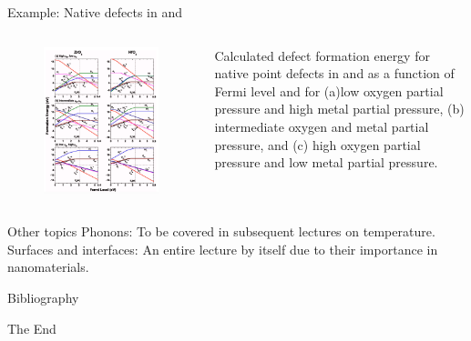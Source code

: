 \documentclass[aspectratio=169]{beamer}
\begin{document}
    \begin{frame}{Example: Native defects in  and }

        \begin{columns}
            \begin{figure}
                \centering
                \includegraphics[width=0.7\linewidth]{lectures/figures/8_Defect_Diagram_ZrO2_HfO2.png}
            \end{figure}
            Calculated defect formation energy for native point defects in  and  as a function of Fermi level and for (a)low oxygen partial pressure and high metal partial pressure, (b) intermediate oxygen and metal partial pressure, and (c) high oxygen partial pressure and low metal partial pressure.\cite{zhengFirstprinciplesStudyNative2007}
        \end{columns}

    \end{frame}

    \begin{frame}{Other topics}
        Phonons: To be covered in subsequent lectures on temperature.\newline
        \newline
        Surfaces and interfaces: An entire lecture by itself due to their importance in nanomaterials.


    \end{frame}

    \begin{frame}[allowframebreaks]{Bibliography}
        
        
    \end{frame}



    \begin{frame}
        \Huge{\centerline{The End}}
    \end{frame}
\end{document}

